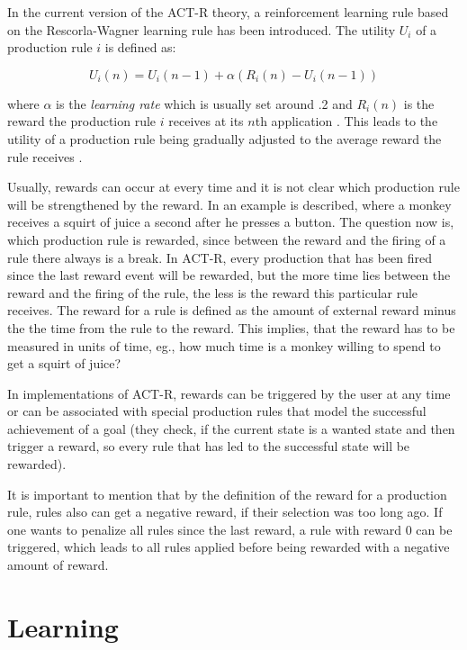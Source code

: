 In the current version of the ACT-R theory, a reinforcement learning rule based on the Rescorla-Wagner learning rule \cite{rescorla_wagner_1972} has been introduced. The utility $U_i$ of a production rule $i$ is defined as:

\begin{equation}
\label{eq:utility_learning}
U_i(n) = U_i(n - 1) + \alpha \left(R_i(n) - U_i(n - 1)\right)
\end{equation}

where $\alpha$ is the \emph{learning rate} which is usually set around .2 and $R_i(n)$ is the reward the production rule $i$ receives at its $n$th application \cite[160--161]{anderson_how_2007}. This leads to the utility of a production rule being gradually adjusted to the average reward the rule receives \cite[6--7]{actr_tutorial}. 

Usually, rewards can occur at every time and it is not clear which production rule will be strengthened by the reward. In \cite[161]{anderson_how_2007} an example is described, where a monkey receives a squirt of juice a second after he presses a button. The question now is, which production rule is rewarded, since between the reward and the firing of a rule there always is a break. In ACT-R, every production that has been fired since the last reward event will be rewarded, but the more time lies between the reward and the firing of the rule, the less is the reward this particular rule receives. The reward for a rule is defined as the amount of external reward minus the the time from the rule to the reward. This implies, that the reward has to be measured in units of time, eg., how much time is a monkey willing to spend to get a squirt of juice? \cite[161]{anderson_how_2007}

In implementations of ACT-R, rewards can be triggered by the user at any time or can be associated with special production rules that model the successful achievement of a goal (they check, if the current state is a wanted state and then trigger a reward, so every rule that has led to the successful state will be rewarded).

It is important to mention that by the definition of the reward for a production rule, rules also can get a negative reward, if their selection was too long ago. If one wants to penalize all rules since the last reward, a rule with reward 0 can be triggered, which leads to all rules applied before being rewarded with a negative amount of reward.

\section{Learning}

